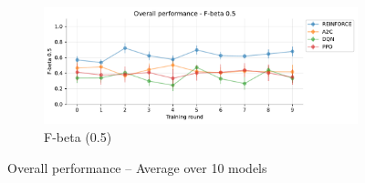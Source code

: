 \documentclass[a4paper, 12pt]{article}
\begin{document}
\begin{figure}[ht]
	\begin{subfigure}{\textwidth}
		\centering
		\includegraphics[width=\linewidth]{Overall_F05.pdf}  
		\caption{F-beta (0.5)}
		\label{fig:tr-ovr-f05}
	\end{subfigure}
	\caption{Overall performance -- Average over 10 models}
	\label{fig:tr-overall}
\end{figure}
\end{document}
